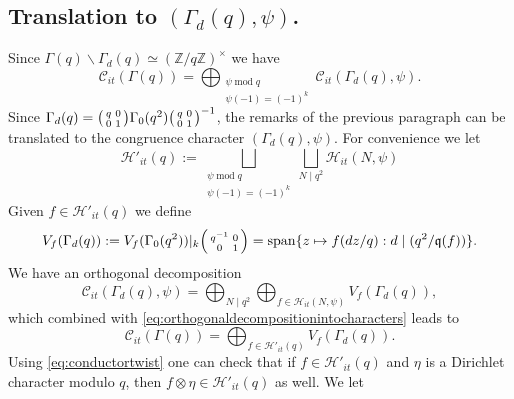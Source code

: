 \documentclass{article}
\theoremstyle{named}
\newcommand{\C}{\mathcal{C}}
\newcommand{\HH}{\mathcal{H}}
\newcommand{\Z}{\mathbb{Z}}
\newcommand{\q}{\mathfrak{q}}
\DeclareMathOperator{\spn}{span}
\DeclareMathOperator{\modulo}{mod}
\begin{document}
\subsection{Translation to $(\Gamma_d(q), \psi)$.} 
Since $\Gamma(q)\backslash \Gamma_d(q) \simeq (\Z/q\Z)^\times$ we have 
\begin{equation}\label{eq:orthogonaldecompositionintocharacters}
    \C_{it}(\Gamma(q)) = \bigoplus_{\substack{\psi \modulo q\\
    \psi(-1) = (-1)^k}} \C_{it}(\Gamma_d(q), \psi).
\end{equation}
Since $\Gamma_d(q) = \begin{psmallmatrix}
    q & 0\\
    0 & 1
\end{psmallmatrix}\Gamma_0(q^2)\begin{psmallmatrix}q & 0\\
    0 & 1
\end{psmallmatrix}^{-1}$, the remarks of the previous paragraph can be translated to the congruence character $(\Gamma_d(q), \psi)$. For convenience we let 
\begin{equation}\label{eq:specificsetofnewforms}
    \HH'_{it}(q) := \bigsqcup_{\substack{\psi \modulo q\\
\psi(-1) = (-1)^k}} \bigsqcup_{N \mid q^2} \HH_{it}(N, \psi)
\end{equation}
Given $f \in \HH'_{it}(q)$ we define
\begin{equation}\label{eq:oldspaceGammad}
    V_f(\Gamma_d(q)) := V_f(\Gamma_0(q^2))|_k \begin{psmallmatrix}
        q^{-1} & 0\\
        0 & 1
    \end{psmallmatrix} = \spn\{z \mapsto f(d z/q) : d \mid (q^2/\q(f))\}.
\end{equation}
We have an orthogonal decomposition
\begin{equation*}
    \C_{it}(\Gamma_d(q), \psi) = \bigoplus_{N \mid q^2}\bigoplus_{f \in \HH_{it}(N, \psi)} V_f(\Gamma_d(q)),
\end{equation*}
which combined with \eqref{eq:orthogonaldecompositionintocharacters} leads to 
\begin{equation}\label{eq:orthogonaldecompositionGamma}
    \C_{it}(\Gamma(q)) = \bigoplus_{f \in \HH'_{it}(q)}V_f(\Gamma_d(q)).
\end{equation}
Using \eqref{eq:conductortwist} one can check that if $f \in \HH'_{it}(q)$ and $\eta$ is a Dirichlet character modulo $q$, then $f\otimes \eta \in \HH'_{it}(q)$ as well. We let 
\end{document}

